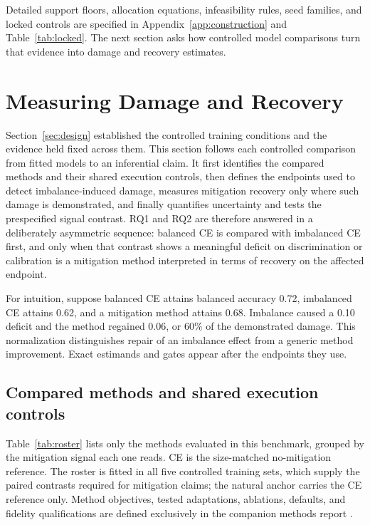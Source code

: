 \documentclass[11pt]{article}
\begin{document}
\noindent Detailed support floors, allocation equations, infeasibility rules, seed families, and locked controls are specified in Appendix~\ref{app:construction} and Table~\ref{tab:locked}. The next section asks how controlled model comparisons turn that evidence into damage and recovery estimates.

\section{Measuring Damage and Recovery}
\label{sec:analysis}
Section~\ref{sec:design} established the controlled training conditions and the evidence held fixed across them. This section follows each controlled comparison from fitted models to an inferential claim. It first identifies the compared methods and their shared execution controls, then defines the endpoints used to detect imbalance-induced damage, measures mitigation recovery only where such damage is demonstrated, and finally quantifies uncertainty and tests the prespecified signal contrast. RQ1 and RQ2 are therefore answered in a deliberately asymmetric sequence: balanced CE is compared with imbalanced CE first, and only when that contrast shows a meaningful deficit on discrimination or calibration is a mitigation method interpreted in terms of recovery on the affected endpoint.

For intuition, suppose balanced CE attains balanced accuracy \num{0.72}, imbalanced CE attains \num{0.62}, and a mitigation method attains \num{0.68}. Imbalance caused a \num{0.10} deficit and the method regained \num{0.06}, or 60\% of the demonstrated damage. This normalization distinguishes repair of an imbalance effect from a generic method improvement. Exact estimands and gates appear after the endpoints they use.

\subsection{Compared methods and shared execution controls}
\label{sec:methods}
\label{sec:training}
Table~\ref{tab:roster} lists only the methods evaluated in this benchmark, grouped by the mitigation signal each one reads. CE is the size-matched no-mitigation reference. The roster is fitted in all five controlled training sets, which supply the paired contrasts required for mitigation claims; the natural anchor carries the CE reference only. Method objectives, tested adaptations, ablations, defaults, and fidelity qualifications are defined exclusively in the companion methods report \citep{queisler2026imbalanceMethods}.
\end{document}
